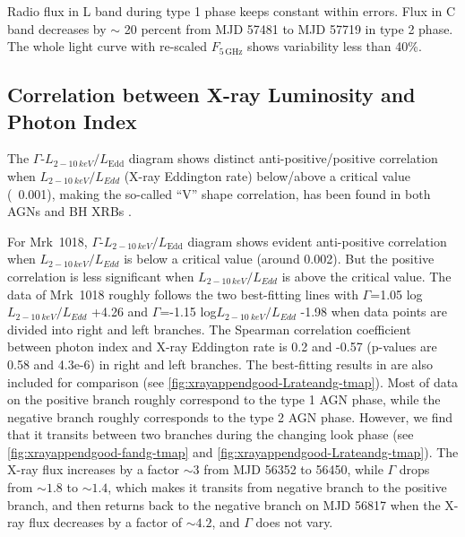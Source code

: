 \documentclass[twocolumn]{aastex63}
\begin{document}
%



Radio flux in L band during type 1 phase keeps constant within errors. Flux in C band decreases by $\sim$ 20 percent from MJD 57481 to MJD 57719 in type 2 phase. The whole light curve with re-scaled $F_\mathrm{5\,GHz}$ shows variability less than 40\%. 




\subsection{Correlation between X-ray Luminosity and Photon Index}
The $\Gamma$-$L_{2-10\,keV}/L_\mathrm{Edd}$ diagram shows distinct anti-positive/positive correlation when $L_{2-10~ keV}/L_{Edd}$ (X-ray Eddington rate) below/above a critical value (~0.001), making the so-called ``V'' shape correlation, has been found in both AGNs and BH XRBs \citep[e.g.][]{2011A&A...530A.149Y,2015MNRAS.447.1692Y}. 

For Mrk~1018, $\Gamma$-$L_{2-10\,keV}/L_\mathrm{Edd}$ diagram shows evident anti-positive correlation when $L_{2-10\,keV}/L_{Edd}$ is below a critical value (around 0.002). But the positive correlation is less significant when $L_{2-10\,keV}/L_{Edd}$ is above the critical value. The data of Mrk~1018 roughly follows the two best-fitting lines with $\Gamma$=1.05 log$L_{2-10~ keV}/L_{Edd}$ +4.26 and $\Gamma$=-1.15 log$L_{2-10~ keV}/L_{Edd}$ -1.98  when data points are divided into right and left branches. The Spearman correlation coefficient between photon index and X-ray Eddington rate is 0.2 and -0.57 (p-values are 0.58 and 4.3e-6) in right and left branches. The best-fitting results in \citet{2015MNRAS.447.1692Y} are also included for comparison (see \autoref{fig:xrayappendgood-Lrateandg-tmap}).  Most of data on the positive branch roughly correspond to the type 1 AGN phase, while the negative branch roughly corresponds to the type 2 AGN phase. However, we find that it transits between two branches during the changing look phase (see \autoref{fig:xrayappendgood-fandg-tmap} and \autoref{fig:xrayappendgood-Lrateandg-tmap}). The X-ray flux increases by a factor $\sim3$ from MJD 56352 to 56450, while $\Gamma$ drops from $\sim1.8$ to $\sim1.4$, which makes it transits from negative branch to the positive branch, and then returns back to the negative branch on MJD 56817 when the X-ray flux decreases by a factor of $\sim4.2$, and $\Gamma$ does not vary. 
\end{document}
